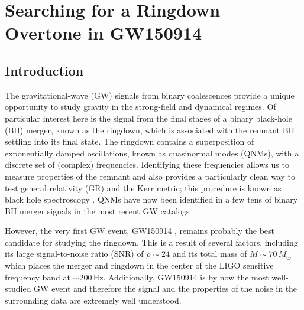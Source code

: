 

\chapter{Searching for a Ringdown Overtone in GW150914}

\label{Chapter4}

\section{Introduction}\label{ch4:sec:introduction}

The gravitational-wave (GW) signals from binary coalescences provide a unique opportunity to study gravity in the strong-field and dynamical regimes.
Of particular interest here is the signal from the final stages of a binary black-hole (BH) merger, known as the ringdown, which is associated with the remnant BH settling into its final state.
The ringdown contains a superposition of exponentially damped oscillations, known as quasinormal modes (QNMs), with a discrete set of (complex) frequencies.
Identifying these frequencies allows us to measure properties of the remnant and also provides a particularly clean way to test general relativity (GR) and the Kerr metric; this procedure is known as black hole spectroscopy \cite{Dreyer:2003bv}.
QNMs have now been identified in a few tens of binary BH merger signals in the most recent GW catalogs~\cite{LIGOScientific:2020tif, LIGOScientific:2021sio}.

However, the very first GW event, GW150914 \cite{LIGOScientific:2016aoc}, remains probably the best candidate for studying the ringdown.
This is a result of several factors, including its large signal-to-noise ratio (SNR) of $\rho\sim 24$ and its total mass of $M\sim 70\,M_\odot$ which places the merger and ringdown in the center of the LIGO \cite{LIGOScientific:2014pky} sensitive frequency band at $\sim 200\,\mathrm{Hz}$. 
Additionally, GW150914 is by now the most well-studied GW event and therefore the signal and the properties of the noise in the surrounding data are extremely well understood.

